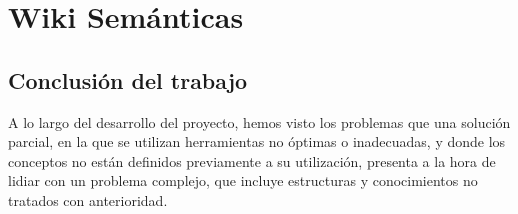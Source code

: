 \chapter{Wiki Semánticas}


\section{Conclusión del trabajo}
A lo largo del desarrollo del proyecto, hemos visto los problemas que una solución parcial, en la que se utilizan herramientas no óptimas o inadecuadas, y donde los conceptos no están definidos previamente a su utilización, presenta a la hora de lidiar con un problema complejo, que incluye estructuras y conocimientos no tratados con anterioridad.

